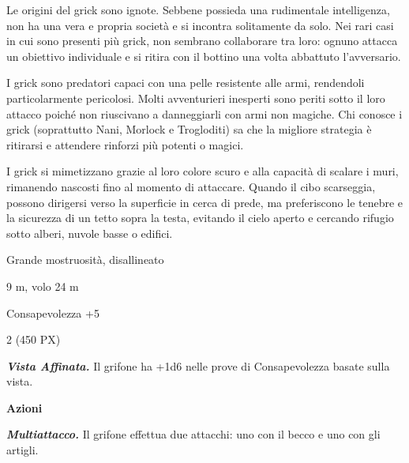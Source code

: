 \begin{multicols}{2}
{Le origini del grick sono ignote. Sebbene possieda una rudimentale intelligenza, non ha una vera e propria società e si incontra solitamente da solo. Nei rari casi in cui sono presenti più grick, non sembrano collaborare tra loro: ognuno attacca un obiettivo individuale e si ritira con il bottino una volta abbattuto l'avversario.

I grick sono predatori capaci con una pelle resistente alle armi, rendendoli particolarmente pericolosi. Molti avventurieri inesperti sono periti sotto il loro attacco poiché non riuscivano a danneggiarli con armi non magiche. Chi conosce i grick (soprattutto Nani, Morlock e Trogloditi) sa che la migliore strategia è ritirarsi e attendere rinforzi più potenti o magici.

I grick si mimetizzano grazie al loro colore scuro e alla capacità di scalare i muri, rimanendo nascosti fino al momento di attaccare. Quando il cibo scarseggia, possono dirigersi verso la superficie in cerca di prede, ma preferiscono le tenebre e la sicurezza di un tetto sopra la testa, evitando il cielo aperto e cercando rifugio sotto alberi, nuvole basse o edifici.

\begin{description}[noitemsep, topsep=0pt, parsep=0pt, partopsep=0pt, itemsep=1pt, leftmargin=2.35cm,  labelwidth=2.2cm, itemindent=0cm, listparindent=0pt] %
\setlength{\baselineskip}{10pt}
\item[\textbf{Taglia/Tipo}] Grande mostruosità, disallineato
\item[\textbf{Caratt.}] 
\item[\textbf{Punti Ferita}] 
\item[\textbf{Movimento}] 9 m, volo 24 m
\item[\textbf{Tiri Salvez.}] 
\item[\textbf{Comp.}] Consapevolezza +5
\item[\textbf{Sensi}] 
\item[\textbf{Sfida}] 2 (450 PX)
\end{description}
\smallskip

\emph{\textbf{Vista Affinata.}} Il grifone ha +1d6 nelle prove di Consapevolezza basate sulla vista.

\textbf{Azioni}

\emph{\textbf{Multiattacco.}} Il grifone effettua due attacchi: uno con il becco e uno con gli artigli.

}
\end{multicols}
